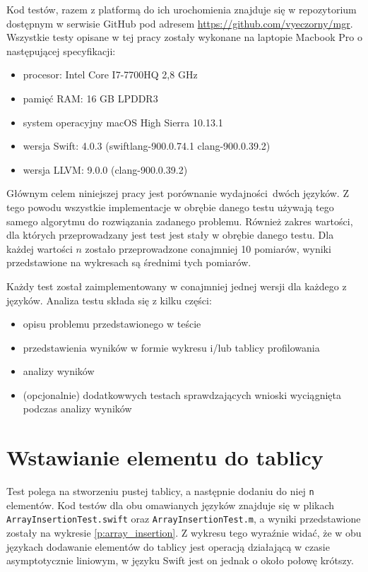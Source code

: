 \documentclass[mgr, shortabstract]{iithesis}
\newcommand{\swiftinline}[1]{
    \texttt{#1}
}
\begin{document}
Kod testów, razem z platformą do ich urochomienia znajduje się w repozytorium dostępnym w serwisie GitHub pod adresem \url{https://github.com/vyeczorny/mgr}. Wszystkie testy opisane w tej pracy zostały wykonane na laptopie Macbook Pro o następującej specyfikacji:

\begin{itemize}
    \item procesor: Intel Core I7-7700HQ 2,8 GHz
    \item pamięć RAM: 16 GB LPDDR3
    \item system operacyjny macOS High Sierra 10.13.1
    \item wersja Swift: 4.0.3 (swiftlang-900.0.74.1 clang-900.0.39.2)
    \item wersja LLVM: 9.0.0 (clang-900.0.39.2)
\end{itemize}

Głównym celem niniejszej pracy jest porównanie wydajności dwóch języków. Z tego powodu wszystkie implementacje w obrębie danego testu używają tego samego algorytmu do rozwiązania zadanego problemu. Również zakres wartości, dla których przeprowadzany jest test jest stały w obrębie danego testu. Dla każdej wartości $n$ zostało przeprowadzone conajmniej 10 pomiarów, wyniki przedstawione na wykresach są średnimi tych pomiarów.

Każdy test został zaimplementowany w conajmniej jednej wersji dla każdego z języków. Analiza testu składa się z kilku części:

\begin{itemize}
    \item opisu problemu przedstawionego w teście
    \item przedstawienia wyników w formie wykresu i/lub tablicy profilowania
    \item analizy wyników
    \item (opcjonalnie) dodatkowwych testach sprawdzających wnioski wyciągnięta podczas analizy wyników
\end{itemize}

\section{Wstawianie elementu do tablicy}

Test polega na stworzeniu pustej tablicy, a następnie dodaniu do niej \swiftinline{n} elementów. Kod testów dla obu omawianych języków znajduje się w plikach \texttt{ArrayInsertionTest.swift} oraz \texttt{ArrayInsertionTest.m}, a wyniki przedstawione zostały na wykresie \ref{p:array_insertion}. Z wykresu tego wyraźnie widać, że w obu językach dodawanie elementów do tablicy jest operacją działającą w czasie asymptotycznie liniowym, w języku Swift jest on jednak o około połowę krótszy.
\end{document}
